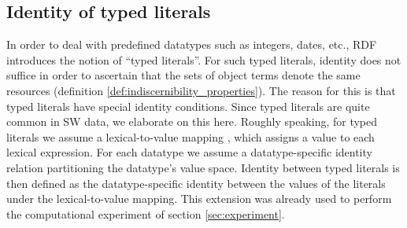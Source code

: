 \subsection{Identity of typed literals}

In order to deal with predefined datatypes such as integers, dates, etc.,
  RDF introduces the notion of ``typed literals''.
For such typed literals, identity does not suffice in order to ascertain
  that the sets of object terms denote the same resources
  (definition \ref{def:indiscernibility_properties}).
The reason for this is that typed literals have special identity conditions.
Since typed literals are quite common in SW data, we elaborate on this here.
Roughly speaking, for typed literals we assume a lexical-to-value mapping
  \cite{Hayes2004}, which assigns a value to each lexical expression.
For each datatype we assume a datatype-specific identity relation
  partitioning the datatype's value space.
Identity between typed literals is then defined
  as the datatype-specific identity between the values of the literals
  under the lexical-to-value mapping.
This extension was already used to perform the computational
  experiment of section \ref{sec:experiment}.

